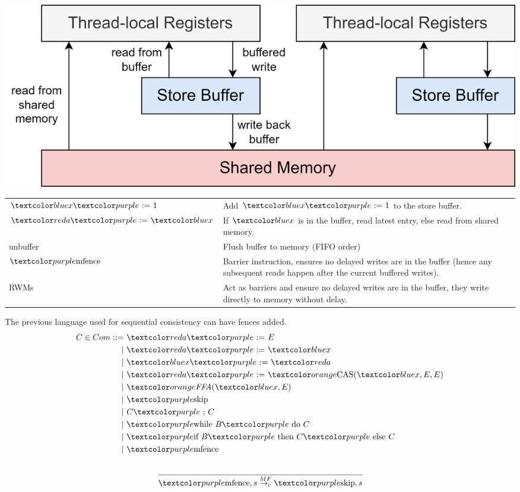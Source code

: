 \begin{center}
    \includegraphics[width=.8\textwidth]{concurrency_semantics/images/tso.drawio.png}
\end{center}
\begin{center}
    \begin{tabular}{l p{}}
        $\wass{\wmem{x}}{1}$ & Add $\wass{\wmem{x}}{1}$ to the store buffer. \\
        $\wass{\wreg{a}}{\wmem{x}}$ & If $\wmem{x}$ is in the buffer, read latest entry, else read from shared memory. \\
        unbuffer & Flush buffer to memory (FIFO order) \\
        $\wmfence$ & Barrier instruction, ensures no delayed writes are in the buffer (hence any subsequent reads happen after the current buffered writes). \\
        RWMs & Act as barriers and ensure no delayed writes are in the buffer, they write directly to memory without delay. \\
    \end{tabular}
\end{center}

The previous language used for sequential consistency can have fences added.
\[\begin{split}
    C \in Com ::= &\  \wass{\wreg{a}}{E} \\
    | & \  \wass{\wreg{a}}{\wmem{x}} \\
    | & \  \wass{\wmem{x}}{\wreg{a}} \\
    | & \  \wass{\wreg{a}}{\wcas{\wmem{x}}{E}{E}}\\
    | & \  \wffa{\wmem{x}}{E} \\
    | & \  \wskip \\
    | & \  \wseq{C}{C} \\
    | & \  \wwhile{B}{C} \\
    | & \  \wif{B}{C}{C} \\
    | & \  \wmfence \\
\end{split}\]

\[\cfrac{}{
        \wmfence, s \ctrans{MF} \wskip, s
    }\]

